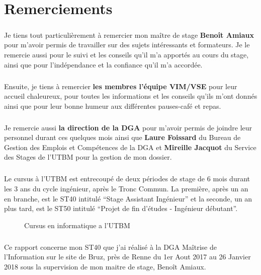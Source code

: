 \documentclass[11pt, book, english, french, standardlists]{upmethodology-document}
\begin{document}
	\chapter*{Remerciements}
		\paragraph*{}
			Je tiens tout particulièrement à remercier mon maître de stage \textbf{Benoît Amiaux} pour m'avoir permis de travailler sur des sujets intéressants et formateurs. Je le remercie aussi pour le suivi et les conseils qu'il m'a apportés au cours du stage, ainsi que pour l'indépendance et la confiance qu'il m'a accordée.
		\paragraph*{}
			Ensuite, je tiens à remercier \textbf{les membres l'équipe VIM/VSE} pour leur accueil chaleureux, pour toutes les informations et les conseils qu’ils m’ont donnés ainsi que pour leur bonne humeur aux différentes pauses-café et repas.
		\paragraph*{}
			Je remercie aussi \textbf{la direction de la DGA} pour m’avoir permis de  joindre leur personnel durant ces quelques mois ainsi que \textbf{Laure Foissard} du Bureau de Gestion des Emplois et Compétences de la DGA et \textbf{Mireille Jacquot} du Service des Stages de l'UTBM pour la gestion de mon dossier.
	\tableofcontents{}
	\listoffigures{}
		\paragraph*{}
			Le cursus à l'\gls{UTBM} est entrecoupé de deux périodes de stage de 6 mois durant les 3 ans du cycle ingénieur, après le Tronc Commun. La première, après un an en branche, est le ST40 intitulé ``Stage Assistant Ingénieur'' et la seconde, un an plus tard, est le ST50 intitulé ``Projet de fin d’études - Ingénieur débutant''.
		\begin{figure}[H]
			\centering%
			\caption{Cursus en informatique a l'\acrshort{UTBM}}%
			\label{fig:Cursus_INFO_UTBM}%
		\end{figure}
		\paragraph*{}
			Ce rapport concerne mon ST40 que j'ai réalisé à la \gls{DGA} Maîtrise de l'Information sur le site de Bruz, près de Renne du 1er Aout 2017 au 26 Janvier 2018 sous la supervision de mon maitre de stage, Benoît Amiaux.
\end{document}
